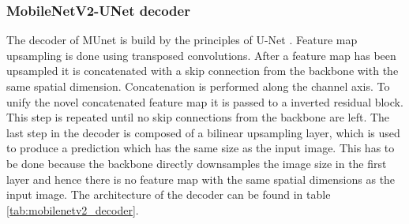 \subsubsection{MobileNetV2-UNet decoder}

The decoder of \ac{MUnet} is build by the principles of U-Net \cite{unet}.
Feature map upsampling is done using transposed convolutions.
After a feature map has been upsampled it is concatenated with a skip connection from the backbone with the same spatial dimension.
Concatenation is performed along the channel axis.
To unify the novel concatenated feature map it is passed to a inverted residual block.
This step is repeated until no skip connections from the backbone are left.
The last step in the decoder is composed of a bilinear upsampling layer, which is used to produce a prediction which has the same size as the input image.
This has to be done because the backbone directly downsamples the image size in the first layer and hence there is no feature map with the same spatial dimensions as the input image.
The architecture of the decoder can be found in table \ref{tab:mobilenetv2_decoder}.

